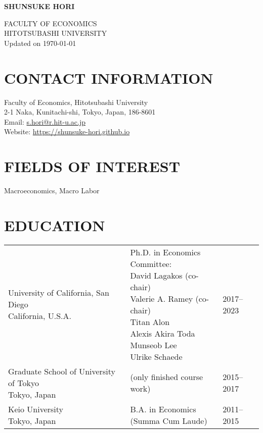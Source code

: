 \documentclass[12pt]{article}
\begin{document}
\begin{center}
    \begin{Large}
        \textbf{SHUNSUKE HORI}\\
    \end{Large}
    FACULTY OF ECONOMICS\\
    HITOTSUBASHI UNIVERSITY\\
    Updated on \today
\end{center}

\section*{CONTACT INFORMATION}
Faculty of Economics, Hitotsubashi University\\
2-1 Naka, Kunitachi-shi, Tokyo, Japan, 186-8601\\
Email: \href{mailto:s.hori@r.hit-u.ac.jp}{s.hori@r.hit-u.ac.jp}\\
Website: \url{https://shunsuke-hori.github.io}

\section*{FIELDS OF INTEREST}
Macroeconomics, Macro Labor

\section*{EDUCATION}
\begin{tabular}{@{}lll}
\makecell[tl]{University of California, San Diego\\\hspace{1em}California, U.S.A.}&\makecell[tl]{
Ph.D. in Economics\\
Committee:\\
\hspace{1em}David Lagakos (co-chair)\\
\hspace{1em}Valerie A. Ramey (co-chair)\\
\hspace{1em}Titan Alon\\
\hspace{1em}Alexis Akira Toda\\
\hspace{1em}Munseob Lee\\
\hspace{1em}Ulrike Schaede}&2017--2023\\
\makecell[tl]{Graduate School of University of Tokyo\\\hspace{1em}Tokyo, Japan}& (only finished course work)&2015--2017\\
\makecell[tl]{Keio University\\\hspace{1em}Tokyo, Japan}&\makecell[tl]{B.A. in Economics\\(Summa Cum Laude)}&2011--2015\\
\end{tabular}
\end{document}
